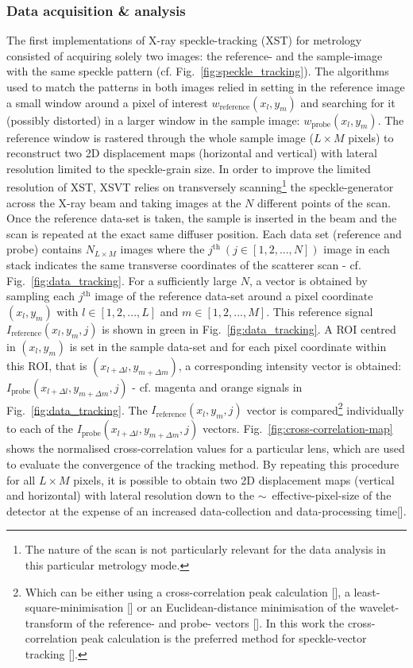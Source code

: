 \begin{refsection}
\subsubsection*{Data acquisition \& analysis}

The first implementations of X-ray speckle-tracking (XST) for metrology consisted of acquiring solely two images: the reference- and the sample-image with the same speckle pattern (cf. Fig.~\ref{fig:speckle_tracking}). The algorithms used to match the patterns in both images relied in setting in the reference image a small window around a pixel of interest $w_\text{reference}(x_l,y_m)$ and searching for it (possibly distorted) in a larger window in the sample image: $w_\text{probe}(x_l,y_m)$. The reference window is rastered through the whole sample image ($L\times M$ pixels) to reconstruct two 2D displacement maps (horizontal and vertical) with lateral resolution limited to the speckle-grain size. In order to improve the limited resolution of XST, XSVT relies on transversely scanning\footnote{The nature of the scan is not particularly relevant for the data analysis in this particular metrology mode.} the speckle-generator across the X-ray beam and taking images at the $N$ different points of the scan. Once the reference data-set is taken, the sample is inserted in the beam and the scan is repeated at the exact same diffuser position. Each data set (reference and probe) contains $N_{L\times M}$ images where the $j^\text{th}~(j\in[1,2,...,N])$ image in each stack indicates the same transverse coordinates of the scatterer scan - cf. Fig.~\ref{fig:data_tracking}. For a sufficiently large $N$, a vector is obtained by sampling each $j^\text{th}$ image of the reference data-set around a pixel coordinate $(x_l,y_m)$ with $l\in[1,2,...,L]$ and $m\in[1,2,...,M]$. This reference signal $I_{\text{reference}}(x_l,y_m,j)$ is shown in green in Fig.~\ref{fig:data_tracking}. A ROI centred in $(x_l,y_m)$ is set in the sample data-set and for each pixel coordinate within this ROI, that is $(x_{l+\Delta l},y_{m+\Delta m})$, a corresponding intensity vector is obtained: $I_{\text{probe}}(x_{l+\Delta l},y_{m+\Delta m},j)$ - cf. magenta and orange signals in Fig.~\ref{fig:data_tracking}. The $I_{\text{reference}}(x_l,y_m,j)$ vector is compared\footnote{Which can be either using a cross-correlation peak calculation [\cite{Berujon2012, Morgan2012}], a least-square-minimisation [\cite{Zanette2014, Zdora2017}] or an Euclidean-distance minimisation of the wavelet-transform of the reference- and probe- vectors [\cite{Qiao2020b}].  In this work the cross-correlation peak calculation is the preferred method for speckle-vector tracking [\cite{Berujon2012, Morgan2012}].} individually to each of the $I_{\text{probe}}(x_{l+\Delta l},y_{m+\Delta m},j)$ vectors. Fig.~\ref{fig:cross-correlation-map} shows the normalised cross-correlation values for a particular lens, which are used to evaluate the convergence of the tracking method. By repeating this procedure for all $L\times M$ pixels, it is possible to obtain two 2D displacement maps (vertical and horizontal) with lateral resolution down to the $\sim$~effective-pixel-size of the detector at the expense of an increased data-collection and data-processing time[\cite{Berujon2016,Berujon2020}].


\end{refsection}
